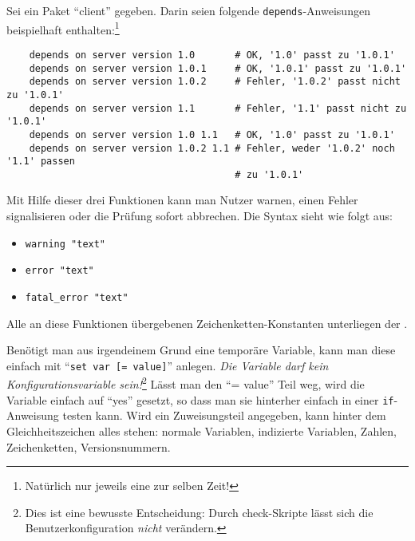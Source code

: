     Sei ein Paket "`client"' gegeben. Darin seien folgende
    \texttt{depends}-Anweisungen beispielhaft enthalten:\footnote{Natürlich nur
    jeweils eine zur selben Zeit!}

\begin{example}
\begin{verbatim}
    depends on server version 1.0       # OK, '1.0' passt zu '1.0.1'
    depends on server version 1.0.1     # OK, '1.0.1' passt zu '1.0.1'
    depends on server version 1.0.2     # Fehler, '1.0.2' passt nicht zu '1.0.1'
    depends on server version 1.1       # Fehler, '1.1' passt nicht zu '1.0.1'
    depends on server version 1.0 1.1   # OK, '1.0' passt zu '1.0.1'
    depends on server version 1.0.2 1.1 # Fehler, weder '1.0.2' noch '1.1' passen
                                        # zu '1.0.1'
\end{verbatim}
\end{example}


    Mit Hilfe dieser drei Funktionen kann man Nutzer warnen, einen
    Fehler signalisieren oder die Prüfung sofort abbrechen. Die Syntax
    sieht wie folgt aus:

    \begin{itemize}
    \item \verb+warning "text"+
    \item \verb+error "text"+
    \item \verb+fatal_error "text"+
    \end{itemize}

    Alle an diese Funktionen übergebenen Zeichenketten-Konstanten unterliegen
    der .


    Benötigt man aus irgendeinem Grund eine temporäre Variable, kann
    man diese einfach mit "`\texttt{set var [= value]}"' anlegen. \emph{Die Variable
    darf kein Konfigurationsvariable sein!}\footnote{Dies ist eine bewusste
    Entscheidung: Durch check-Skripte lässt sich die Benutzerkonfiguration
    \emph{nicht} verändern.} Lässt man den "`= value"' Teil weg,
    wird die Variable einfach auf "`yes"' gesetzt, so dass man sie
    hinterher einfach in einer \texttt{if}-Anweisung testen kann. Wird ein
    Zuweisungsteil angegeben, kann hinter dem Gleichheitszeichen alles
    stehen: normale Variablen, indizierte Variablen, Zahlen,
    Zeichenketten, Versionsnummern.

